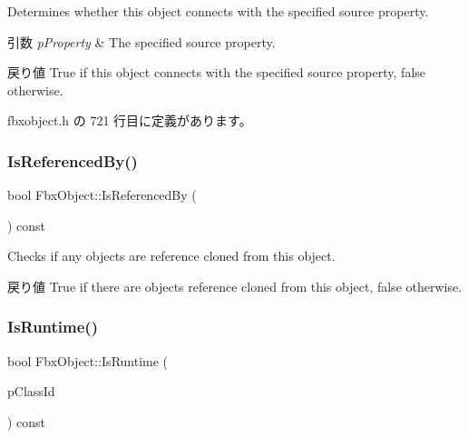 Determines whether this object connects with the specified source property. 
\begin{DoxyParams}{引数}
{\em p\+Property} & The specified source property. \\
\hline
\end{DoxyParams}
\begin{DoxyReturn}{戻り値}
{\ttfamily True} if this object connects with the specified source property, {\ttfamily false} otherwise. 
\end{DoxyReturn}


 fbxobject.\+h の 721 行目に定義があります。

\mbox{\label{class_fbx_object_af64184bd9341c8a3300588c818594328}} 
\subsubsection{\texorpdfstring{Is\+Referenced\+By()}{IsReferencedBy()}}
{\footnotesize\ttfamily bool Fbx\+Object\+::\+Is\+Referenced\+By (\begin{DoxyParamCaption}{ }\end{DoxyParamCaption}) const}

Checks if any objects are reference cloned from this object. \begin{DoxyReturn}{戻り値}
{\ttfamily True} if there are objects reference cloned from this object, {\ttfamily false} otherwise. 
\end{DoxyReturn}
\mbox{\label{class_fbx_object_ac1f9e5981fbf87911d669e078495cb09}} 
\subsubsection{\texorpdfstring{Is\+Runtime()}{IsRuntime()}}
{\footnotesize\ttfamily bool Fbx\+Object\+::\+Is\+Runtime (\begin{DoxyParamCaption}\item[{const \hyperlink{class_fbx_class_id}{Fbx\+Class\+Id} \&}]{p\+Class\+Id }\end{DoxyParamCaption}) const}

